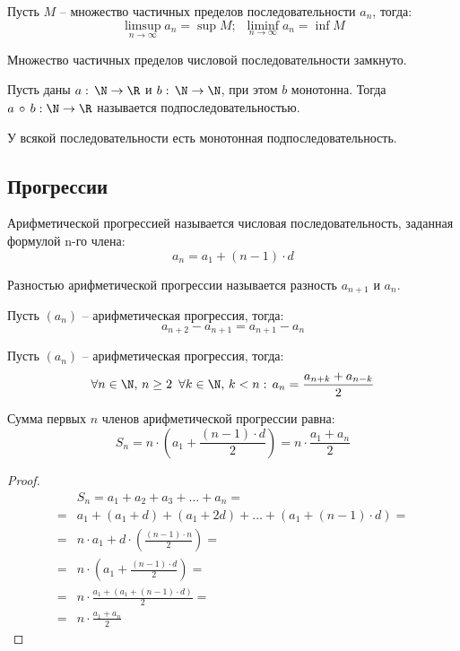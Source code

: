 \documentclass[12pt]{article}
\begin{document}
\begin{theorem}
    Пусть $M$ -- множество частичных пределов последовательности $a_n$, тогда:
    $$\limsup_{n\to\infty}a_n=\sup M;\enspace\liminf_{n\to\infty}a_n=\inf M$$
\end{theorem}
\begin{theorem}
    Множество частичных пределов числовой последовательности замкнуто.
\end{theorem}
\begin{definition}
    Пусть даны $a:\,\N\to\R$ и $b:\,\N\to\N$, при этом $b$ монотонна. Тогда $a\,\circ\, b:\\\N\to\R$ называется подпоследовательностью.
\end{definition}
\begin{statement}
    У всякой последовательности есть монотонная подпоследовательность.
\end{statement}

\subsection{Прогрессии}

\begin{definition}
    Арифметической прогрессией называется числовая последовательность, заданная формулой n-го члена:
    $$a_n=a_1+(n-1)\cdot d$$
\end{definition}

\begin{definition}
    Разностью арифметической прогрессии называется разность $a_{n+1}$ и $a_n$.
\end{definition}

\begin{statement}
    Пусть $(a_n)$ -- арифметическая прогрессия, тогда:
    $$a_{n+2}-a_{n+1}=a_{n+1}-a_n$$
\end{statement}

\begin{statement}
    Пусть $(a_n)$ -- арифметическая прогрессия, тогда:
    $$\forall n \in \N,\,n\geq 2 \enspace\forall k \in \N,\, k<n:\, a_n=\frac{a_{n+k}+a_{n-k}}{2}$$
\end{statement}

\begin{theorem}
    Сумма первых $n$ членов арифметической прогрессии равна:
    $$S_n=n\cdot \left(a_1+\frac{(n-1)\cdot d}{2} \right)=n \cdot \frac{a_1 + a_n}{2}$$
\end{theorem}

\begin{proof}
    \begin{align*}
        &S_n=a_1+a_2+a_3+\ldots+a_n=\\
        =&a_1+(a_1+d)+(a_1+2d)+\ldots+(a_1+(n-1)\cdot d)=\\
        =&n\cdot a_1+d\cdot \left( \frac{(n-1)\cdot n}{2} \right)=\\
        =&n\cdot \left(a_1+\frac{(n-1)\cdot d}{2} \right)=\\
        =&n \cdot \frac{a_1 + (a_1 + (n-1)\cdot d)}{2}=\\
        =&n\cdot \frac{a_1 + a_n}{2}
    \end{align*}
\end{proof}
\end{document}
